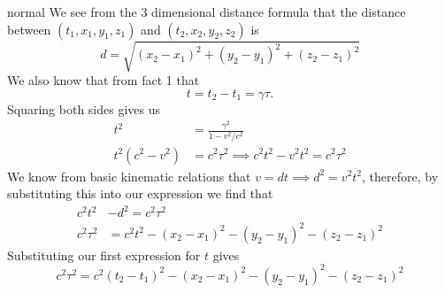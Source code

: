 \begin{solution}{normal}
We see from the 3 dimensional distance formula that the distance between $(t_1, x_1, y_1, z_1)$ and $(t_2, x_2, y_2, z_2)$ is 
\[d = \sqrt{(x_2-x_1)^2 + (y_2 - y_1)^2 + (z_2 - z_1)^2}\]
We also know that from fact 1 that
\[t = t_2 - t_1 = \gamma\tau.\]
Squaring both sides gives us 
\begin{align*}
t^2 &= \frac{\gamma^2}{1-v^2/c^2}\\
t^2 (c^2 - v^2) &= c^2\tau^2 \implies c^2t^2 - v^2t^2 = c^2\tau^2
\end{align*}
We know from basic kinematic relations that $v= dt\implies d^2 = v^2t^2$, therefore, by substituting this into our expression we find that 
\begin{align*}
c^2t^2 &- d^2= c^2\tau^2\\
c^2\tau^2&= c^2t^2 - (x_2-x_1)^2 - (y_2 - y_1)^2 - (z_2 - z_1)^2
\end{align*}
Substituting our first expression for $t$ gives 
\[\boxed{c^2\tau^2= c^2(t_2 - t_1)^2 - (x_2-x_1)^2 - (y_2 - y_1)^2 - (z_2 - z_1)^2}\]
\end{solution}
